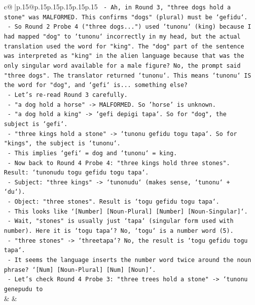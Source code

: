 \documentclass{article}
\begin{document}
{\begin{supertabular}{c@{$\;$}|p{.15\linewidth}@{}p{.15\linewidth}p{.15\linewidth}p{.15\linewidth}p{.15\linewidth}p{.15\linewidth}}
{{{\texttt{    {-} Ah, in Round 3, "three dogs hold a stone" was MALFORMED. This confirms "dogs" (plural) must be `gefidu`.} \\
\texttt{    {-} So Round 2 Probe 4 ("three dogs...") used `tunonu` (king) because I had mapped "dog" to `tunonu` incorrectly in my head, but the actual translation used the word for "king". The "dog" part of the sentence was interpreted as "king" in the alien language because that was the only singular word available for a male figure? No, the prompt said "three dogs". The translator returned `tunonu`. This means `tunonu` IS the word for "dog", and `gefi` is... something else?} \\
\texttt{    {-} Let's re{-}read Round 3 carefully.} \\
\texttt{    {-} "a dog hold a horse" {-}> MALFORMED. So 'horse' is unknown.} \\
\texttt{    {-} "a dog hold a king" {-}> `gefi depigi tapa`. So for "dog", the subject is `gefi`.} \\
\texttt{    {-} "three kings hold a stone" {-}> `tunonu gefidu togu tapa`. So for "kings", the subject is `tunonu`.} \\
\texttt{    {-} This implies `gefi` = dog and `tunonu` = king.} \\
\texttt{    {-} Now back to Round 4 Probe 4: "three kings hold three stones". Result: `tunonudu togu gefidu togu tapa`.} \\
\texttt{    {-} Subject: "three kings" {-}> `tunonudu` (makes sense, `tunonu` + `du`).} \\
\texttt{    {-} Object: "three stones". Result is `togu gefidu togu tapa`.} \\
\texttt{    {-} This looks like `{[}Number{]} {[}Noun{-}Plural{]} {[}Number{]} {[}Noun{-}Singular{]}`.} \\
\texttt{    {-} Wait, "stones" is usually just `tapa` (singular form used with number). Here it is `togu tapa`? No, `togu` is a number word (5).} \\
\texttt{    {-} "three stones" {-}> `threetapa`? No, the result is `togu gefidu togu tapa`.} \\
\texttt{    {-} It seems the language inserts the number word twice around the noun phrase? `{[}Num{]} {[}Noun{-}Plural{]} {[}Num{]} {[}Noun{]}`.} \\
\texttt{    {-} Let's check Round 4 Probe 3: "three trees hold a stone" {-}> `tunonu genepudu to} \\
            }
        }
    }
    & & \\ \\


\end{supertabular}}
\end{document}
